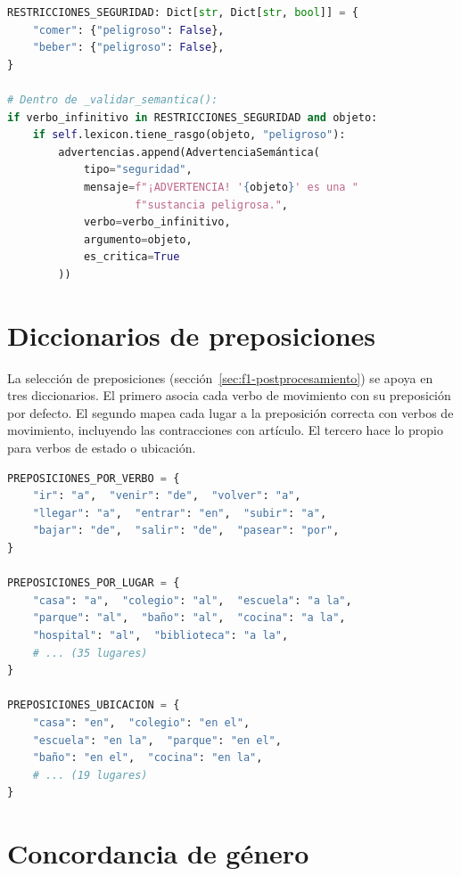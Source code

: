 \begin{lstlisting}[language=Python,caption={Restricciones de seguridad y su validación (\texttt{postprocessor.py}).},label={lst:restricciones-seguridad},basicstyle=\ttfamily\small,xleftmargin=1cm]
RESTRICCIONES_SEGURIDAD: Dict[str, Dict[str, bool]] = {
    "comer": {"peligroso": False},
    "beber": {"peligroso": False},
}

# Dentro de _validar_semantica():
if verbo_infinitivo in RESTRICCIONES_SEGURIDAD and objeto:
    if self.lexicon.tiene_rasgo(objeto, "peligroso"):
        advertencias.append(AdvertenciaSemántica(
            tipo="seguridad",
            mensaje=f"¡ADVERTENCIA! '{objeto}' es una "
                    f"sustancia peligrosa.",
            verbo=verbo_infinitivo,
            argumento=objeto,
            es_critica=True
        ))
\end{lstlisting}

\section{Diccionarios de preposiciones}

La selección de preposiciones (sección~\ref{sec:f1-postprocesamiento}) se apoya en tres diccionarios. El primero asocia cada verbo de movimiento con su preposición por defecto. El segundo mapea cada lugar a la preposición correcta con verbos de movimiento, incluyendo las contracciones con artículo. El tercero hace lo propio para verbos de estado o ubicación.

\begin{lstlisting}[language=Python,caption={Diccionarios de preposiciones (\texttt{postprocessor.py}).},label={lst:preposiciones},basicstyle=\ttfamily\small,xleftmargin=1cm]
PREPOSICIONES_POR_VERBO = {
    "ir": "a",  "venir": "de",  "volver": "a",
    "llegar": "a",  "entrar": "en",  "subir": "a",
    "bajar": "de",  "salir": "de",  "pasear": "por",
}

PREPOSICIONES_POR_LUGAR = {
    "casa": "a",  "colegio": "al",  "escuela": "a la",
    "parque": "al",  "baño": "al",  "cocina": "a la",
    "hospital": "al",  "biblioteca": "a la",
    # ... (35 lugares)
}

PREPOSICIONES_UBICACION = {
    "casa": "en",  "colegio": "en el",
    "escuela": "en la",  "parque": "en el",
    "baño": "en el",  "cocina": "en la",
    # ... (19 lugares)
}
\end{lstlisting}

\section{Concordancia de género}

